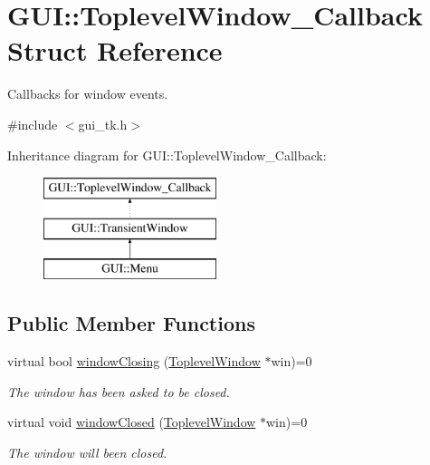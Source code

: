 \hypertarget{structGUI_1_1ToplevelWindow__Callback}{\section{G\-U\-I\-:\-:Toplevel\-Window\-\_\-\-Callback Struct Reference}
\label{structGUI_1_1ToplevelWindow__Callback}
}


Callbacks for window events.  




{\ttfamily \#include $<$gui\-\_\-tk.\-h$>$}

Inheritance diagram for G\-U\-I\-:\-:Toplevel\-Window\-\_\-\-Callback\-:\begin{figure}[H]
\begin{center}
\leavevmode
\includegraphics[height=3.000000cm]{structGUI_1_1ToplevelWindow__Callback}
\end{center}
\end{figure}
\subsection*{Public Member Functions}
\begin{DoxyCompactItemize}
\item 
virtual bool \hyperlink{structGUI_1_1ToplevelWindow__Callback_a3f556e220592d267a7f4d4b79a8f311b}{window\-Closing} (\hyperlink{classGUI_1_1ToplevelWindow}{Toplevel\-Window} $\ast$win)=0
\begin{DoxyCompactList}\small\item\em The window has been asked to be closed. \end{DoxyCompactList}\item 
virtual void \hyperlink{structGUI_1_1ToplevelWindow__Callback_ad02e7827ad3b68f4ea3d0c66fa2a7717}{window\-Closed} (\hyperlink{classGUI_1_1ToplevelWindow}{Toplevel\-Window} $\ast$win)=0
\begin{DoxyCompactList}\small\item\em The window will been closed. \end{DoxyCompactList}\end{DoxyCompactItemize}


